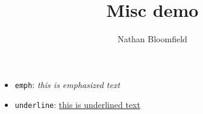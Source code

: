 \documentclass{ximera}
\title{Misc demo}
\author{Nathan Bloomfield}
\begin{document}
\maketitle

\begin{itemize}
\item \texttt{emph}: \emph{this is emphasized text}
\item \texttt{underline}: \underline{this is underlined text}
\end{itemize}
\end{document}
